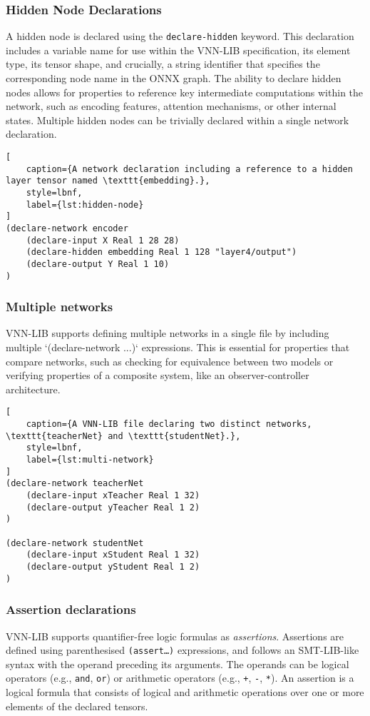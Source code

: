 \subsubsection*{Hidden Node Declarations}
A hidden node is declared using the \texttt{declare-hidden} keyword. This declaration includes a variable name for use within the VNN-LIB specification, 
its element type, its tensor shape, and crucially, a string identifier that specifies the corresponding node name in the ONNX graph. The ability to declare hidden nodes
allows for properties to reference key intermediate computations within the network, such as encoding features, attention mechanisms, or other internal states. Multiple
hidden nodes can be trivially declared within a single network declaration.

\begin{lstlisting}[
    caption={A network declaration including a reference to a hidden layer tensor named \texttt{embedding}.}, 
    style=lbnf,
    label={lst:hidden-node}
]
(declare-network encoder
    (declare-input X Real 1 28 28)
    (declare-hidden embedding Real 1 128 "layer4/output")
    (declare-output Y Real 1 10)
)
\end{lstlisting}

\subsubsection*{Multiple networks}
VNN-LIB supports defining multiple networks in a single file by including multiple `(declare-network ...)` expressions. This is essential for properties that compare networks, 
such as checking for equivalence between two models or verifying properties of a composite system, like an observer-controller architecture.

\begin{lstlisting}[
    caption={A VNN-LIB file declaring two distinct networks, \texttt{teacherNet} and \texttt{studentNet}.},
    style=lbnf,
    label={lst:multi-network}
]
(declare-network teacherNet
    (declare-input xTeacher Real 1 32)
    (declare-output yTeacher Real 1 2)
)

(declare-network studentNet
    (declare-input xStudent Real 1 32)
    (declare-output yStudent Real 1 2)
)
\end{lstlisting}

\subsubsection*{Assertion declarations}
VNN-LIB supports quantifier-free logic formulas as \textit{assertions}. Assertions are defined using parenthesised \texttt{(assert\ldots)} expressions, and follows an SMT-LIB-like syntax with the 
operand preceding its arguments. The operands can be logical operators (e.g., \texttt{and}, \texttt{or}) or arithmetic operators (e.g., \texttt{+}, \texttt{-}, \texttt{*}).
An assertion is a logical formula that consists of logical and arithmetic operations over one or more elements of the declared tensors.

